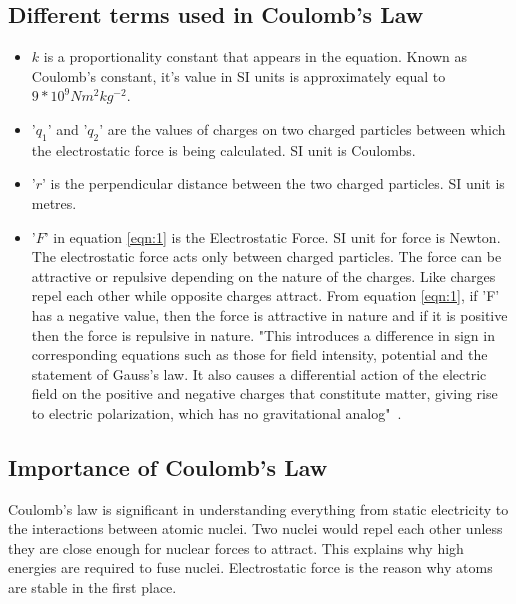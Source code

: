 \subsection{Different terms used in Coulomb's Law}
\begin{itemize}

	\item $k$ is a proportionality constant that appears in the equation. Known as Coulomb's constant, it's value in SI units is approximately equal to $9*10^9 N m^{2} kg^{-2}$.
	\item '$q_1$' and '$q_2$' are the values of charges on two charged particles between which the electrostatic force is being calculated. SI unit is Coulombs.
	\item '$r$' is the perpendicular distance between the two charged particles. SI unit is metres. 
	\item '$F$' in equation \ref{eqn:1} is the Electrostatic Force. SI unit for force is Newton. The electrostatic force acts only between charged particles. The force can be attractive or repulsive depending on the nature of the charges. Like charges repel each other while opposite charges attract. From equation \ref{eqn:1}, if 'F' has a negative value, then the force is attractive in nature and if it is positive then the force is repulsive in nature. "This introduces a difference in sign in corresponding equations such as those for field intensity, potential and the statement of Gauss's law. It also causes a differential action of the electric field on the positive and negative charges that constitute matter, giving rise to electric polarization, which has no gravitational analog"~\cite{Murdock1944}.
	
\end{itemize}

\subsection{Importance of Coulomb's Law}

Coulomb's law is significant in understanding everything from static electricity to the interactions between atomic nuclei.
Two nuclei would repel each other unless they are close enough for nuclear forces to attract. This explains why high energies are required to fuse nuclei. Electrostatic force is the reason why atoms are stable in the first place.


%
%

